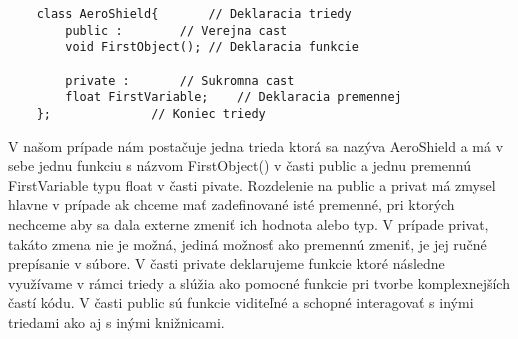 \begin{lstlisting}
	class AeroShield{		// Deklaracia triedy
		public :		// Verejna cast
		void FirstObject();	// Deklaracia funkcie
		
		private :		// Sukromna cast
		float FirstVariable;	// Deklaracia premennej
	};				// Koniec triedy
\end{lstlisting}
\newpage

V našom prípade nám postačuje jedna trieda ktorá sa nazýva AeroShield a má v sebe jednu funkciu s názvom FirstObject() v časti public a jednu premennú FirstVariable typu float v časti pivate. Rozdelenie na public a privat má zmysel hlavne v prípade ak chceme mať zadefinované isté premenné, pri ktorých nechceme aby sa dala externe zmeniť ich hodnota alebo typ. V prípade privat, takáto zmena nie je možná, jediná možnosť ako premennú zmeniť, je jej ručné prepísanie v súbore. V časti private deklarujeme funkcie ktoré následne využívame v rámci triedy a slúžia ako pomocné funkcie pri tvorbe komplexnejších častí kódu. V časti public sú funkcie viditeľné a schopné interagovať s inými triedami ako aj s inými knižnicami. 


